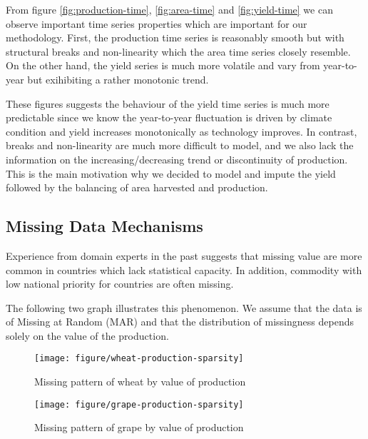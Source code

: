 \documentclass[nojss]{jss}\usepackage[]{graphicx}\usepackage[]{color}
\makeatletter
\def\maxwidth{ %
  \ifdim\Gin@nat@width>\linewidth
    \linewidth
  \else
    \Gin@nat@width
  \fi
}
\newenvironment{knitrout}{}{} %
\makeatother
\begin{document}
From figure \ref{fig:production-time}, \ref{fig:area-time} and
\ref{fig:yield-time} we can observe important time series properties
which are important for our methodology. First, the production time
series is reasonably smooth but with structural breaks and
non-linearity which the area time series closely resemble. On the
other hand, the yield series is much more volatile and vary from
year-to-year but exihibiting a rather monotonic trend.

These figures suggests the behaviour of the yield time series is much
more predictable since we know the year-to-year fluctuation is driven
by climate condition and yield increases monotonically as technology
improves. In contrast, breaks and non-linearity are much more
difficult to model, and we also lack the information on the
increasing/decreasing trend or discontinuity of production. This is
the main motivation why we decided to model and impute the yield
followed by the balancing of area harvested and production.

\FloatBarrier
\subsection{Missing Data Mechanisms}

Experience from domain experts in the past suggests that missing value
are more common in countries which lack statistical capacity. In
addition, commodity with low national priority for countries are often
missing.

The following two graph illustrates this phenomenon. We assume that
the data is of Missing at Random (MAR) and that the distribution of
missingness depends solely on the value of the production.

\begin{knitrout}
\color{fgcolor}\begin{figure}[!ht]


{\centering \texttt{[image: figure/wheat-production-sparsity]} 

}

\caption[Missing pattern of wheat by value of production]{Missing pattern of wheat by value of production\label{fig:wheat-production-sparsity}}
\end{figure}


\end{knitrout}



\begin{knitrout}
\color{fgcolor}\begin{figure}[!ht]


{\centering \texttt{[image: figure/grape-production-sparsity]} 

}

\caption[Missing pattern of grape by value of production]{Missing pattern of grape by value of production\label{fig:grape-production-sparsity}}
\end{figure}


\end{knitrout}
\end{document}
